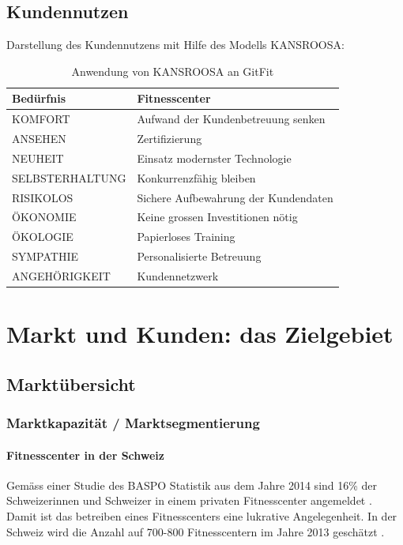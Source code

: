 \subsection{Kundennutzen}
Darstellung des Kundennutzens mit Hilfe des Modells KANSROOSA:
\begin{table}[H]
	\centering
	\begin{tabu} to \linewidth {l l}
		\toprule 
		Bedürfnis & Fitnesscenter \\
		\midrule
		KOMFORT & Aufwand der Kundenbetreuung senken \\
		ANSEHEN & Zertifizierung \\
		NEUHEIT & Einsatz modernster Technologie \\
		SELBSTERHALTUNG & Konkurrenzfähig bleiben \\
		RISIKOLOS & Sichere Aufbewahrung der Kundendaten \\
		ÖKONOMIE & Keine grossen Investitionen nötig \\
		ÖKOLOGIE & Papierloses Training \\
		SYMPATHIE & Personalisierte Betreuung \\
		ANGEHÖRIGKEIT & Kundennetzwerk \\
		\bottomrule 
	\end{tabu} 
	\caption{Anwendung von KANSROOSA an GitFit}
\end{table}


\clearpage
\section{Markt und Kunden: das Zielgebiet}

\subsection{Marktübersicht}

\subsubsection{Marktkapazität / Marktsegmentierung}\label{sec:marktkapazitat}

\paragraph{Fitnesscenter in der Schweiz}
Gemäss einer Studie des BASPO Statistik aus dem Jahre 2014 sind 16\% der Schweizerinnen und Schweizer in einem privaten Fitnesscenter angemeldet \cite{schweizer+fitness}. Damit ist das betreiben eines Fitnesscenters eine lukrative Angelegenheit. In der Schweiz wird die Anzahl auf 700-800 Fitnesscentern im Jahre 2013 geschätzt \cite{fitness-studios+1+milliarde}\cite{fitness+tribune}.

